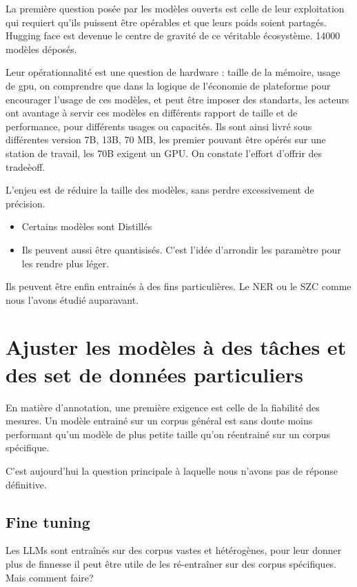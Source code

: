 \documentclass[
  letterpaper,
  DIV=11,
  numbers=noendperiod]{scrreprt}
\begin{document}
La première question posée par les modèles ouverts est celle de leur
exploitation qui requiert qu'ils puissent être opérables et que leurs
poids soient partagés. Hugging face est devenue le centre de gravité de
ce véritable écosystème. 14000 modèles déposés.

Leur opérationnalité est une question de hardware : taille de la
mémoire, usage de gpu, on comprendre que dans la logique de l'économie
de plateforme pour encourager l'usage de ces modèles, et peut être
imposer des standarts, les acteurs ont avantage à servir ces modèles en
différents rapport de taille et de performance, pour différents usages
ou capacités. Ils sont ainsi livré sous différentes version 7B, 13B, 70
MB, les premier pouvant être opérés sur une station de travail, les 70B
exigent un GPU. On constate l'effort d'offrir des tradeèoff.

L'enjeu est de réduire la taille des modèles, sans perdre excessivement
de précision.

\begin{itemize}
\item
  Certains modèles sont Distillés
\item
  Ils peuvent aussi être quantisisés. C'est l'idée d'arrondir les
  paramètre pour les rendre plus léger.
\end{itemize}

Ils peuvent être enfin entrainés à des fins particulières. Le NER ou le
SZC comme nous l'avons étudié auparavant.

\section{Ajuster les modèles à des tâches et des set de données
particuliers}\label{ajuster-les-moduxe8les-uxe0-des-tuxe2ches-et-des-set-de-donnuxe9es-particuliers}

En matière d'annotation, une première exigence est celle de la fiabilité
des mesures. Un modèle entrainé sur un corpus général est sans doute
moins performant qu'un modèle de plus petite taille qu'on réentrainé sur
un corpus spécifique.

C'est aujourd'hui la question principale à laquelle nous n'avons pas de
réponse définitive.

\subsection{Fine tuning}\label{fine-tuning}

Les LLMs sont entraînés sur des corpus vastes et hétérogènes, pour leur
donner plus de finnesse il peut être utile de les ré-entraîner sur des
corpus spécifiques. Mais comment faire?
\end{document}
